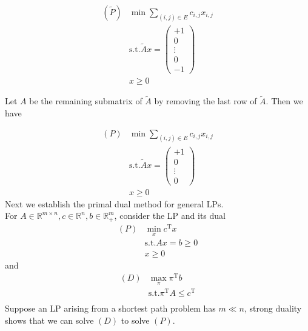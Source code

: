 \documentclass[12pt]{article}
\newcommand{\st}{\mathrm{s.t.}}
\newcommand{\T}{\mathrm{T}}
\theoremstyle{definition}
\begin{document}
\begin{align*}
(\tilde{P}) &\min \sum_{(i,j)\in E} c_{i,j}x_{i,j}\\
            &\st \tilde{A}x=\begin{pmatrix} +1\\0\\\vdots\\0\\-1\end{pmatrix}\\
            &x\geq 0 
\end{align*}

Let $A$ be the remaining submatrix of $\tilde{A}$ by removing the last row of $\tilde{A}$. Then we have

\begin{align*}
(P) &\min \sum_{(i,j)\in E} c_{i,j}x_{i,j}\\
            &\st \tilde{A}x=\begin{pmatrix} +1\\0\\\vdots\\0\end{pmatrix}\\
            &x\geq 0 
\end{align*}
Next we establish the primal dual method for general LPs.\\
For $A\in\mathbb{R}^{m\times n}, c\in \mathbb{R}^n, b\in \mathbb{R}_{+}^m$, consider the LP and its dual
\begin{align*}
(P) & \min_x c^\T x\\
    & \st Ax=b\geq 0\\
    & x\geq 0
\end{align*}
and 
\begin{align*}
(D) & \max_\pi \pi^\T b\\
    & \st \pi^\T A\leq c^\T\\
\end{align*}
Suppose an LP arising from  a shortest path problem has $m\ll n$, strong duality shows that we can solve $(D)$ to solve $(P)$.\\
\end{document}
